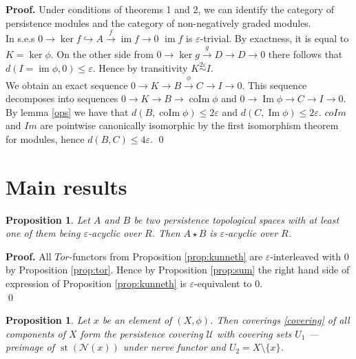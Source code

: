 \documentclass[english,12pt]{article}
\newcounter{stmcounter}[section]
\numberwithin{equation}{section}
\newtheorem{proposition}[stmcounter]{Proposition}
\theoremstyle{definition}
\theoremstyle{remark}
\newenvironment{pf}{\noindent\textbf{Proof.}}{\qed}
\renewcommand{\leq}{\leqslant}
\begin{document}
\begin{pf}
  Under conditions of theorems 1 and 2, we can identify the category of persistence modules and the category of non-negatively graded modules.\\

  In s.e.s $0 \to \ker{f} \hookrightarrow A \xrightarrow{f} \operatorname{im}f \to 0$ $\operatorname{im}f$ is $\varepsilon$-trivial. By exactness, it is equal to $K = \ker \phi$. On the other side from $0 \to \ker{g} \xrightarrow{g} D \to D \to 0$ there follows that $d(I = \operatorname{im} \phi, 0) \leq \varepsilon$. Hence by transitivity $K \stackrel{2\varepsilon}{\sim} I$.\\

  We obtain an exact sequence $0 \to K \to B \xrightarrow{\phi} C \to I \to 0$. This sequence decomposes into sequences $0 \to K \to B \to \operatorname{coIm}\phi$ and $0 \to \operatorname{Im}\phi \to C \to I \to 0$. By lemma \ref{ops} we have that $d(B,\operatorname{coIm}\phi) \leq 2\varepsilon$ and $d(C,\operatorname{Im}\phi) \leq 2\varepsilon$. $coIm$ and $Im$ are pointwise canonically isomorphic by the first isomorphism theorem for modules, hence $d(B, C) \leq 4\varepsilon$.
\end{pf}\\

\section{Main results}

\begin{proposition}
  \label{prop:acyclic}
  Let $A$ and $B$ be two persistence topological spaces with at least one of them being $\varepsilon$-acyclic over $R$. Then $A \star B$ is $\varepsilon$-acyclic over $R$.
\end{proposition}

\begin{pf}
  All $Tor$-functors from Proposition \ref{prop:kunneth} are $\varepsilon$-interleaved with $0$ by Proposition \ref{prop:tor}. Hence by Proposition \ref{prop:sum} the right hand side of expression of Proposition \ref{prop:kunneth} is $\varepsilon$-equivalent to $0$.\\
\end{pf}\\

\begin{proposition}
  Let $x$ be an element of $(X,\phi)$. Then coverings \eqref{covering} of all components of $X$ form the persistence covering $\mathcal{U}$ with covering sets $U_1$ --- preimage of $\operatorname{st}(\mathcal{N}(x))$ under nerve functor and $U_2 = X \setminus \{x\}$.
\end{proposition}
\end{document}
